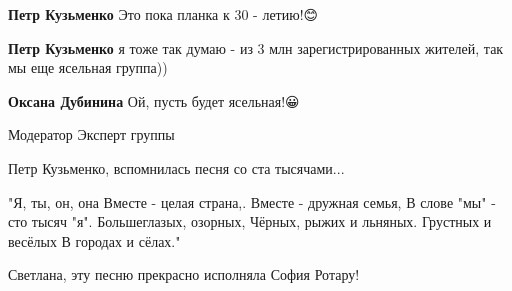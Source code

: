 \begin{itemize}
\begin{itemize}
 
\textbf{Петр Кузьменко}
Это пока планка к 30 - летию!😊


 
\textbf{Петр Кузьменко} я тоже так думаю - из 3 млн зарегистрированных жителей, так мы еще ясельная группа))\Laughey[1.0][white]\Laughey[1.0][white]

\begin{itemize}
 
\textbf{Оксана Дубинина}
Ой, пусть будет ясельная!😀
\end{itemize}

 
Модератор Эксперт группы

Петр Кузьменко, вспомнилась песня со ста тысячами... 

\obeycr
"Я, ты, он, она
Вместе - целая страна,.
Вместе - дружная семья,
В слове "мы" - сто тысяч "я".
Большеглазых, озорных,
Чёрных, рыжих и льняных.
Грустных и весёлых
В городах и сёлах."\Smiley[1.0][yellow]
\restorecr

\begin{itemize}
 
Светлана, эту песню прекрасно исполняла София Ротару!🤝
\end{itemize}


\end{itemize}
\end{itemize}
